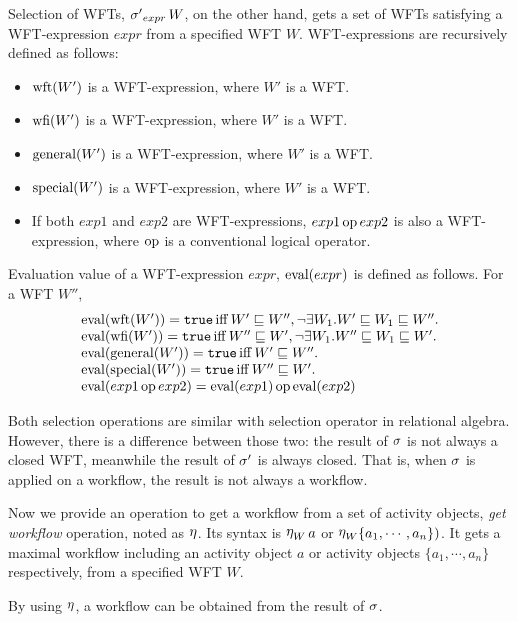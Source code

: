 Selection of WFTs, $\mathop{\sigma'}_{expr} W$, on the other hand, gets a set of
WFTs satisfying a WFT-expression $expr$ from a specified WFT $W$.
WFT-expressions are recursively defined as follows:
\begin{itemize}
 \itemsep0mm\parskip0mm
 \item $\mathop{\rm wft}\nolimits(W')$ is a WFT-expression, where $W'$ is a WFT.
 \item $\mathop{\rm wfi}\nolimits(W')$ is a WFT-expression, where $W'$ is a WFT.
 \item $\mathop{\rm general}\nolimits(W')$ is a WFT-expression, where $W'$ is a WFT.
 \item $\mathop{\rm special}\nolimits(W')$ is a WFT-expression, where $W'$ is a WFT.
 \item If both $exp1$ and $exp2$ are WFT-expressions, $exp1 \mathop{\rm op}\nolimits
      exp2$ is also a WFT-expression, where $\mathop{\rm op}\nolimits$ is a conventional logical
      operator.
\end{itemize}
Evaluation value of a WFT-expression $expr$, $\mathop{\rm eval}\nolimits(expr)$ is
defined as follows.  For a WFT $W''$,
\[
 \begin{array}{l}
  \mathop{\rm eval}\nolimits(\mathop{\rm wft}\nolimits(W')) = {\tt true} \mathop{\rm iff}\nolimits W' \sqsubseteq W'',
      \neg\exists W_1. W' \sqsubseteq W_1 \sqsubseteq W''.\\
  \mathop{\rm eval}\nolimits(\mathop{\rm wfi}\nolimits(W')) = {\tt true} \mathop{\rm iff}\nolimits W'' \sqsubseteq W',
      \neg\exists W_1. W'' \sqsubseteq W_1 \sqsubseteq W'.\\
  \mathop{\rm eval}\nolimits(\mathop{\rm general}\nolimits(W')) = {\tt true}  \mathop{\rm iff}\nolimits W' \sqsubseteq W''.\\
  \mathop{\rm eval}\nolimits(\mathop{\rm special}\nolimits(W')) = {\tt true} \mathop{\rm iff}\nolimits W'' \sqsubseteq W'.\\
  \mathop{\rm eval}\nolimits(exp1 \mathop{\rm op}\nolimits exp2) = \mathop{\rm eval}\nolimits(exp1) \mathop{\rm op}\nolimits \mathop{\rm eval}\nolimits(exp2)
 \end{array}
\]

Both selection operations are similar with selection operator in
relational algebra.  However, there is a difference between those two:
the result of $\mathop{\sigma}$ is not always a closed WFT, meanwhile the result
of $\mathop{\sigma'}$ is always closed.  That is, when $\mathop{\sigma}$ is applied on a
workflow, the result is not always a workflow.

Now we provide an operation to get a workflow from a set of activity
objects, {\em get workflow} operation, noted as $\mathop{\eta}$.  Its
syntax is $\mathop{\eta}_W a$ or $\mathop{\eta}_W \{a_1, \cdots, a_n\})$.
It gets a maximal workflow including an activity object $a$ or activity
objects $\{a_1, \cdots, a_n\}$ respectively, from a specified WFT $W$.

By using $\mathop{\eta}$, a workflow can be obtained from the result of
$\mathop{\sigma}$.

